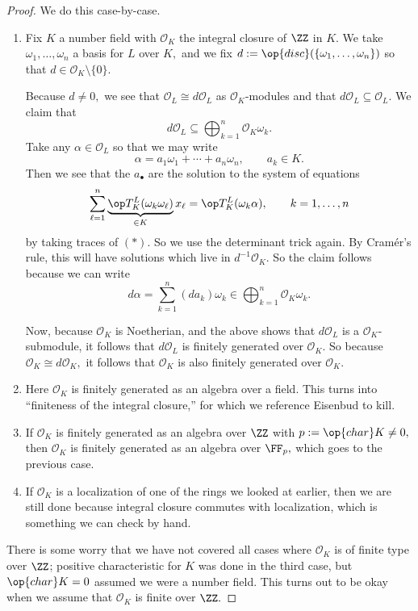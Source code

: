 \documentclass[../notes.tex]{subfiles}
\begin{document}
\begin{proof}
    We do this case-by-case.
    \begin{enumerate}
        \item Fix $K$ a number field with $\mathcal O_K$ the integral closure of $\ZZ$ in $K.$ We take $\omega_1,\ldots,\omega_n$ a basis for $L$ over $K,$ and we fix $d:=\op{disc}(\{\omega_1,\ldots,\omega_n\})$ so that $d\in\mathcal O_K\setminus\{0\}.$
        
        Because $d\ne0,$ we see that $\mathcal O_L\cong d\mathcal O_L$ as $\mathcal O_K$-modules and that $d\mathcal O_L\subseteq\mathcal O_L.$ We claim that
        \[d\mathcal O_L\subseteq\bigoplus_{k=1}^n\mathcal O_K\omega_k.\]
        Take any $\alpha\in\mathcal O_L$ so that we may write
        \[\alpha=a_1\omega_1+\cdots+a_n\omega_n,\qquad a_k\in K.\tag{$(*)$}\]
        Then we see that the $a_\bullet$ are the solution to the system of equations
        \[\sum_{\ell=1}^n\underbrace{\op T_K^L(\omega_k\omega_\ell)}_{\in K}x_\ell=\op T_K^L(\omega_k\alpha),\qquad k=1,\ldots,n\]
        by taking traces of $(*).$ So we use the determinant trick again. By Cram\'er's rule, this will have solutions which live in $d^{-1}\mathcal O_K.$ So the claim  follows because we can write
        \[d\alpha=\sum_{k=1}^n(da_k)\omega_k\in\bigoplus_{k=1}^n\mathcal O_K\omega_k.\]
        
        Now, because $\mathcal O_K$ is Noetherian, and the above shows that $d\mathcal O_L$ is a $\mathcal O_K$-submodule, it follows that $d\mathcal O_L$ is finitely generated over $\mathcal O_K.$ So because $\mathcal O_K\cong d\mathcal O_K,$ it follows that $\mathcal O_K$ is also finitely generated over $\mathcal O_K.$
        
        \item Here $\mathcal O_K$ is finitely generated as an algebra over a field. This turns into ``finiteness of the integral closure,'' for which we reference Eisenbud to kill.
        
        \item If $\mathcal O_K$ is finitely generated as an algebra over $\ZZ$ with $p:=\op{char}K\ne0,$ then $\mathcal O_K$ is finitely generated as an algebra over $\FF_p,$ which goes to the previous case.
        
        \item If $\mathcal O_K$ is a localization of one of the rings we looked at earlier, then we are still done because integral closure commutes with localization, which is something we can check by hand.
    \end{enumerate}
    There is some worry that we have not covered all cases where $\mathcal O_K$ is of finite type over $\ZZ$; positive characteristic for $K$ was done in the third case, but $\op{char}K=0$ assumed we were a number field. This turns out to be okay when we assume that $\mathcal O_K$ is finite over $\ZZ.$
\end{proof}
\end{document}
